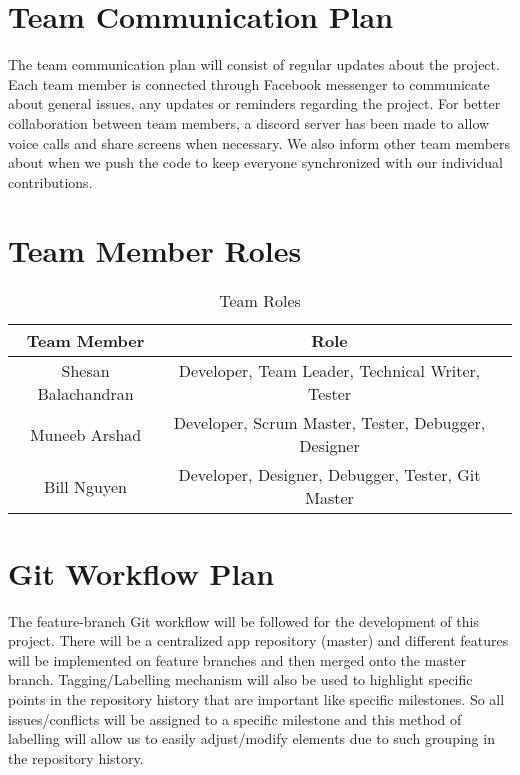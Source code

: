 \documentclass{article}
\begin{document}
\section{Team Communication Plan}

The team communication plan will consist of regular updates about the project. Each team member is connected through Facebook messenger to communicate about general issues, any updates or reminders regarding the project. For better collaboration between team members, a discord server has been made to allow voice calls and share screens when necessary. We also inform other team members about when we push the code to keep everyone synchronized with our individual contributions. 

\section{Team Member Roles}

\begin{table}[h]
	\begin{center}
		\begin{tabular}{| c | c | c |} 
			\hline
			Team Member & Role\\ 
			\hline
			Shesan Balachandran & Developer, Team Leader, Technical Writer, Tester\\
			\hline
			Muneeb Arshad & Developer, Scrum Master, Tester, Debugger, Designer \\ 
			\hline
			Bill Nguyen & Developer, Designer, Debugger, Tester, Git Master\\
			\hline
		\end{tabular}
	\end{center}
	\caption{Team Roles}
	\label{tab:my_label}
\end{table}

\section{Git Workflow Plan}

The feature-branch Git workflow will be followed for the development of this project. There will be a centralized app repository (master) and different features will be implemented on feature branches and then merged onto the master branch. Tagging/Labelling mechanism will also be used to highlight specific points in the repository history that are important like specific milestones. So all issues/conflicts will be assigned to a specific milestone and this method of labelling will allow us to easily adjust/modify elements due to such grouping in the repository history. 
\end{document}
